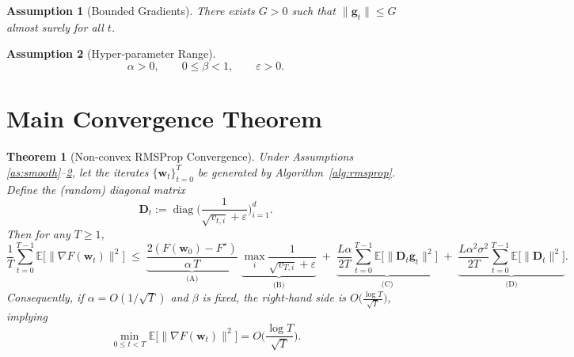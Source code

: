 \documentclass{article}
\newtheorem{theorem}{Theorem}
\newtheorem{assumption}{Assumption}
\newcommand{\E}{\mathbb{E}}
\begin{document}
\begin{assumption}[Bounded Gradients]\label{as:bounded}
There exists $G>0$ such that $\|\mathbf g_{t}\|\le G$ almost surely for all $t$.
\end{assumption}

\begin{assumption}[Hyper‑parameter Range]\label{as:hyper}
\[
\alpha>0,\qquad 0\le\beta<1,\qquad \varepsilon>0.
\]
\end{assumption}

\section*{Main Convergence Theorem}
\begin{theorem}[Non‑convex RMSProp Convergence]\label{thm:main}
Under Assumptions \ref{as:smooth}–\ref{as:hyper}, let the iterates $\{\mathbf w_{t}\}_{t=0}^{T}$ be generated by Algorithm~\ref{alg:rmsprop}. Define the (random) diagonal matrix
\[
\mathbf D_{t}:=\operatorname{diag}\!\Big(\frac{1}{\sqrt{v_{t,i}}+\varepsilon}\Big)_{i=1}^{d}.
\]
Then for any $T\ge1$,
\[
\frac{1}{T}\sum_{t=0}^{T-1}\E\!\big[\|\nabla F(\mathbf w_{t})\|^{2}\big]
\;\le\;
\underbrace{\frac{2(F(\mathbf w_{0})-F^{\star})}{\alpha\,T}}_{\displaystyle\text{(A)}}
\;\underbrace{\max_{i}\frac{1}{\sqrt{v_{T,i}}+\varepsilon}}_{\displaystyle\text{(B)}}
\;+\;
\underbrace{\frac{L\alpha}{2T}\sum_{t=0}^{T-1}\E\!\big[\|\mathbf D_{t}\mathbf g_{t}\|^{2}\big]}_{\displaystyle\text{(C)}}
\;+\;
\underbrace{\frac{L\alpha^{2}\sigma^{2}}{2T}\sum_{t=0}^{T-1}\E\!\big[\|\mathbf D_{t}\|^{2}\big]}_{\displaystyle\text{(D)}}.
\tag{5}
\]
Consequently, if $\alpha=O(1/\sqrt{T})$ and $\beta$ is fixed, the right‑hand side is $O\!\big(\tfrac{\log T}{\sqrt{T}}\big)$, implying
\[
\min_{0\le t<T}\E\!\big[\|\nabla F(\mathbf w_{t})\|^{2}\big]=O\!\Big(\frac{\log T}{\sqrt{T}}\Big).
\]
\end{theorem}
\end{document}
